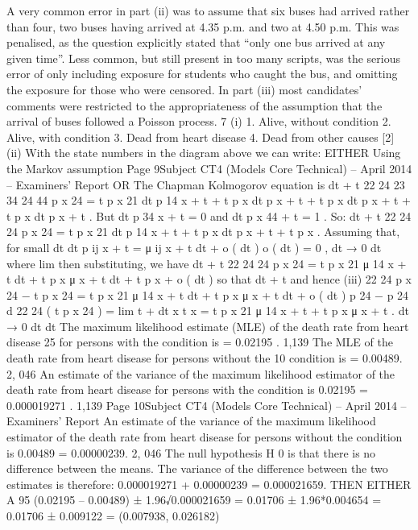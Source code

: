 \documentclass[a4paper,12pt]{article}
\begin{document}
\begin{enumerate}
A very common error in part (ii) was to assume that six buses had arrived rather than four,
two buses having arrived at 4.35 p.m. and two at 4.50 p.m. This was penalised, as the
question explicitly stated that “only one bus arrived at any given time”. Less common, but
still present in too many scripts, was the serious error of only including exposure for students
who caught the bus, and omitting the exposure for those who were censored. In part (iii)
most candidates’ comments were restricted to the appropriateness of the assumption that the
arrival of buses followed a Poisson process.
7
(i)
1. Alive, without
condition 2. Alive, with
condition
3. Dead from heart
disease 4. Dead from other
causes
[2]
(ii)
With the state numbers in the diagram above we can write:
EITHER
Using the Markov assumption
Page 9Subject CT4 (Models Core Technical) – April 2014 – Examiners’ Report
OR
The Chapman Kolmogorov equation is
dt + t 22
24
23
34
24
44
p x 24 = t p x 21 dt p 14
x + t + t p x dt p x + t + t p x dt p x + t + t p x dt p x + t .
But dt
p 34
x + t = 0
and dt
p x 44 + t = 1 .
So:
dt + t
22
24
24
p x 24 = t p x 21 dt p 14
x + t + t p x dt p x + t + t p x .
Assuming that, for small dt
dt
p ij x + t = μ ij x + t dt + o ( dt )
o ( dt )
= 0 ,
dt → 0 dt
where lim
then substituting, we have
dt + t
22 24
24
p x 24 = t p x 21 μ 14
x + t dt + t p x μ x + t dt + t p x + o ( dt )
so that
dt + t
and hence
(iii)
22 24
p x 24 − t p x 24 = t p x 21 μ 14
x + t dt + t p x μ x + t dt + o ( dt )
p 24 − p 24
d
22 24
( t p x 24 ) = lim t + dt x t x = t p x 21 μ 14
x + t + t p x μ x + t .
dt → 0
dt
dt
The maximum likelihood estimate (MLE) of the death rate from heart disease
25
for persons with the condition is
= 0.02195 .
1,139
The MLE of the death rate from heart disease for persons without the
10
condition is
= 0.00489.
2, 046
An estimate of the variance of the maximum likelihood estimator of the death
rate from heart disease for persons with the condition is
0.02195
= 0.000019271 .
1,139
Page 10Subject CT4 (Models Core Technical) – April 2014 – Examiners’ Report
An estimate of the variance of the maximum likelihood estimator of the death
rate from heart disease for persons without the condition is
0.00489
= 0.00000239.
2, 046
The null hypothesis H 0 is that there is no difference between the means.
The variance of the difference between the two estimates is therefore:
0.000019271 + 0.00000239 = 0.000021659.
THEN EITHER
A 95%
(0.02195 – 0.00489) ± 1.96√0.000021659
= 0.01706 ± 1.96*0.004654
= 0.01706 ± 0.009122
= (0.007938, 0.026182)

\end{enumerate}
\end{document}

